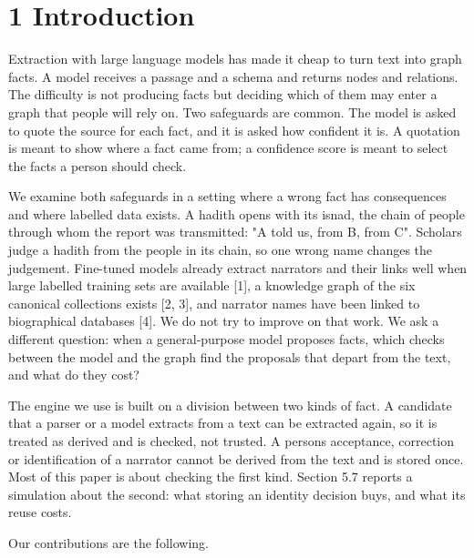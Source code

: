 \documentclass[
  english,
]{article}
\begin{document}
\section{1 Introduction}\label{introduction}

Extraction with large language models has made it cheap to turn text
into graph facts. A model receives a passage and a schema and returns
nodes and relations. The difficulty is not producing facts but deciding
which of them may enter a graph that people will rely on. Two safeguards
are common. The model is asked to quote the source for each fact, and it
is asked how confident it is. A quotation is meant to show where a fact
came from; a confidence score is meant to select the facts a person
should check.

We examine both safeguards in a setting where a wrong fact has
consequences and where labelled data exists. A hadith opens with its
isnad, the chain of people through whom the report was transmitted: "A
told us, from B, from C". Scholars judge a hadith from the people in its
chain, so one wrong name changes the judgement. Fine-tuned models
already extract narrators and their links well when large labelled
training sets are available {[}1{]}, a knowledge graph of the six
canonical collections exists {[}2, 3{]}, and narrator names have been
linked to biographical databases {[}4{]}. We do not try to improve on
that work. We ask a different question: when a general-purpose model
proposes facts, which checks between the model and the graph find the
proposals that depart from the text, and what do they cost?

The engine we use is built on a division between two kinds of fact. A
candidate that a parser or a model extracts from a text can be extracted
again, so it is treated as derived and is checked, not trusted. A
person\textquotesingle s acceptance, correction or identification of a
narrator cannot be derived from the text and is stored once. Most of
this paper is about checking the first kind. Section 5.7 reports a
simulation about the second: what storing an identity decision buys, and
what its reuse costs.

Our contributions are the following.
\end{document}

